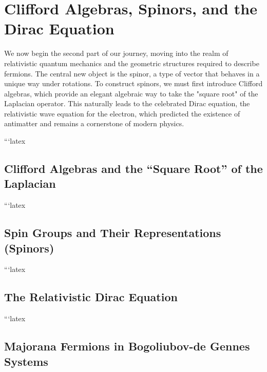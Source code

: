 \chapter{Clifford Algebras, Spinors, and the Dirac Equation}
\label{chap:clifford_spinors}

We now begin the second part of our journey, moving into the realm of relativistic quantum mechanics and the geometric structures required to describe fermions. The central new object is the spinor, a type of vector that behaves in a unique way under rotations. To construct spinors, we must first introduce Clifford algebras, which provide an elegant algebraic way to take the "square root" of the Laplacian operator. This naturally leads to the celebrated Dirac equation, the relativistic wave equation for the electron, which predicted the existence of antimatter and remains a cornerstone of modern physics.





```latex
\section{Clifford Algebras and the ``Square Root'' of the Laplacian}
\label{sec:clifford_algebras}

```latex
\section{Spin Groups and Their Representations (Spinors)}
\label{sec:spin_groups_spinors}

```latex
\section{The Relativistic Dirac Equation}
\label{sec:relativistic_dirac}

```latex
\section{Majorana Fermions in Bogoliubov-de Gennes Systems}
\label{sec:majorana_fermions}

